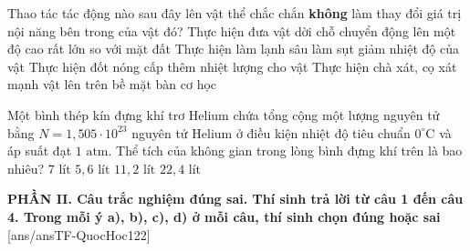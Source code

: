 \begin{ex}	Thao tác tác động nào sau đây lên vật thể chắc chắn \textbf{không} làm thay đổi giá trị nội năng bên trong của vật đó?
	\choice
	{\True Thực hiện đưa vật dời chỗ chuyển động lên một độ cao rất lớn so với mặt đất}
	{Thực hiện làm lạnh sâu làm sụt giảm nhiệt độ của vật}
	{Thực hiện đốt nóng cấp thêm nhiệt lượng cho vật}
	{Thực hiện chà xát, cọ xát mạnh vật lên trên bề mặt bàn cơ học}
\end{ex}

\begin{ex}	Một bình thép kín đựng khí trơ Helium chứa tổng cộng một lượng nguyên tử bằng $N = 1,505 \cdot 10^{23}$ nguyên tử Helium ở điều kiện nhiệt độ tiêu chuẩn $0^\circ\text{C}$ và áp suất đạt $1\text{ atm}$. Thể tích của không gian trong lòng bình đựng khí trên là bao nhiêu?
	\choice
	{$7\text{ lít}$}
	{\True $5,6\text{ lít}$}
	{$11,2\text{ lít}$}
	{$22,4\text{ lít}$}
\end{ex}


\noindent \textbf{PHẦN II. Câu trắc nghiệm đúng sai. Thí sinh trả lời từ câu 1 đến câu 4. Trong mỗi ý a), b), c), d) ở mỗi câu, thí sinh chọn đúng hoặc sai}
[ans/ansTF-QuocHoc122]

